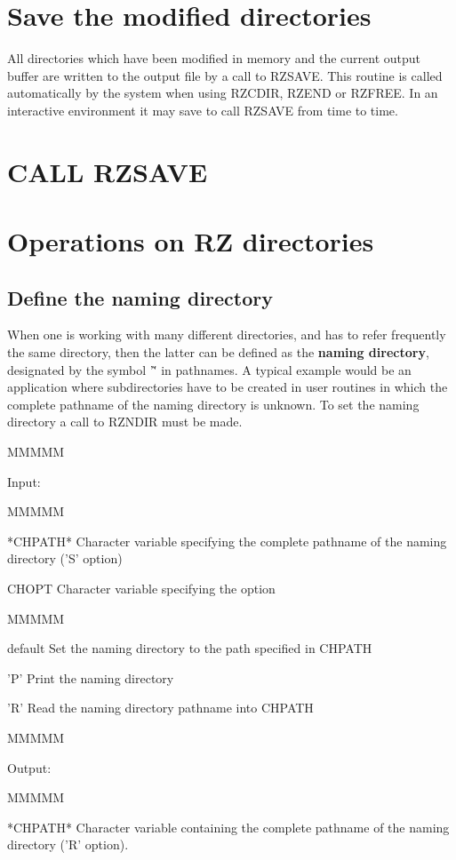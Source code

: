 \section{Save the modified directories}
\par All directories which have been modified in memory
and the current output buffer are written to the output file by a call
to RZSAVE. This routine is called
automatically by the system when using RZCDIR, RZEND or
RZFREE. In an interactive environment it may save to call RZSAVE from
time to time.
\section{\protect\label{RZSAVE}CALL RZSAVE}
\section{Operations on RZ directories}
\subsection{Define the naming directory}
\par When one is working with many different directories, and has to
refer frequently the same directory, then the latter can be defined
as the {\bf naming directory}, designated by the symbol '\~' in
pathnames.
A typical example would be an application where subdirectories have
to be created in user routines in which the complete pathname of the
naming directory is unknown.
To set the naming directory a call to RZNDIR must be made.
\begin{DL}{MMMMM}
\item[Input:
]
\begin{DL}{MMMMM}
\item[*CHPATH*
]Character variable specifying the complete pathname of the
naming directory ('S' option)
\item[CHOPT
]Character variable specifying the option
\begin{DL}{MMMMM}
\item[default
]Set the naming directory to the path specified in CHPATH
\item['P'
]Print the naming directory
\item['R'
]Read the naming directory pathname into CHPATH
\end{DL}
\end{DL}
\end{DL}
\begin{DL}{MMMMM}
\item[Output:
]
\begin{DL}{MMMMM}
\item[*CHPATH*
]Character variable containing the complete pathname of the
naming directory ('R' option).
\end{DL}
\end{DL}

